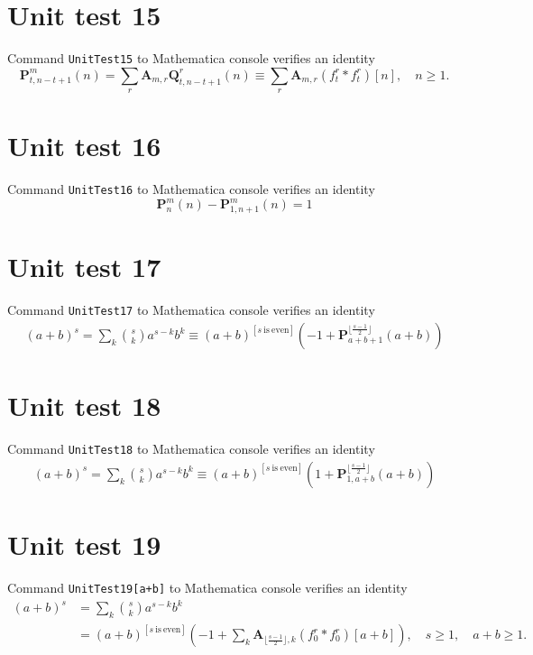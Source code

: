 \documentclass[12pt, letterpaper]{amsart}
\theoremstyle{definition}
\theoremstyle{remark}
\numberwithin{equation}{section}
\begin{document}
\section*{Unit test 15}
Command \verb"UnitTest15" to Mathematica console verifies an identity
\begin{equation*}
\mathbf{P}^{m}_{t,n-t+1}(n)
=\sum\limits_{r}\mathbf{A}_{m,r} \mathbf{Q}_{t,n-t+1}^r(n)
\equiv \sum\limits_{r}\mathbf{A}_{m,r} (f_{t}^{r} \ast f_{t}^{r})[n], \quad n\geq 1.
\end{equation*}
\section*{Unit test 16}
Command \verb"UnitTest16" to Mathematica console verifies an identity
\begin{equation*}
\mathbf{P}^{m}_{n}(n) - \mathbf{P}^{m}_{1,n+1}(n) = 1
\end{equation*}
\section*{Unit test 17}
Command \verb"UnitTest17" to Mathematica console verifies an identity
\begin{equation*}
\begin{split}
(a+b)^s =\sum_{k} \binom{s}{k} a^{s-k} b^k \equiv(a+b)^{[s \ \mathrm{is} \ \mathrm{even}]} \left(-1 + \mathbf{P}^{\lfloor \tfrac{s-1}{2} \rfloor}_{a+b+1}(a+b)\right)
\end{split}
\end{equation*}
\section*{Unit test 18}
Command \verb"UnitTest18" to Mathematica console verifies an identity
\begin{equation*}
\begin{split}
(a+b)^s
=\sum_{k} \binom{s}{k} a^{s-k} b^k
\equiv(a+b)^{[s \ \mathrm{is} \ \mathrm{even}]} \left(1 + \mathbf{P}^{\lfloor \tfrac{s-1}{2} \rfloor}_{1,a+b}(a+b)\right)
\end{split}
\end{equation*}
\section*{Unit test 19}
Command \verb"UnitTest19[a+b]" to Mathematica console verifies an identity
\begin{equation*}
\begin{split}
(a+b)^s
&=\sum_{k} \binom{s}{k} a^{s-k} b^k \\
&=(a+b)^{[s \ \mathrm{is} \ \mathrm{even}]} \left(-1 + \sum_{k}^{ \ }\mathbf{A}_{\lfloor \tfrac{s-1}{2} \rfloor, k}(f^{r}_{0} \ast f^{r}_{0})[a+b]\right), \quad s\geq 1, \quad a+b\geq 1.
\end{split}
\end{equation*}
\end{document}
